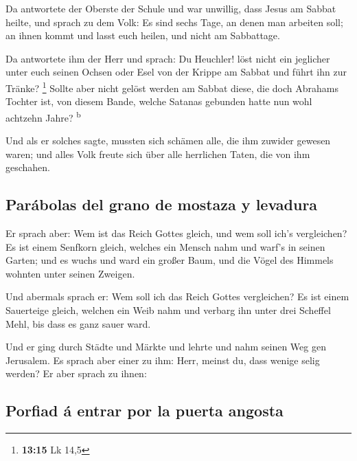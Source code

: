  Da antwortete der Oberste der Schule und war unwillig,
dass Jesus am Sabbat heilte, und sprach zu dem Volk: Es sind sechs Tage,
an denen man arbeiten soll; an ihnen kommt und lasst euch heilen, und
nicht am Sabbattage.

 Da antwortete ihm der Herr und sprach: Du Heuchler! löst
nicht ein jeglicher unter euch seinen Ochsen oder Esel von der Krippe am
Sabbat und führt ihn zur Tränke? \footnote{\textbf{13:15} Lk 14,5}
 Sollte aber nicht gelöst werden am Sabbat diese, die
doch Abrahams Tochter ist, von diesem Bande, welche Satanas gebunden
hatte nun wohl achtzehn Jahre? \textsuperscript{b}

 Und als er solches sagte, mussten sich schämen alle, die
ihm zuwider gewesen waren; und alles Volk freute sich über alle
herrlichen Taten, die von ihm geschahen.

\hypertarget{paruxe1bolas-del-grano-de-mostaza-y-levadura}{%
\subsection{Parábolas del grano de mostaza y
levadura}\label{paruxe1bolas-del-grano-de-mostaza-y-levadura}}

 Er sprach aber: Wem ist das Reich Gottes gleich, und wem
soll ich's vergleichen?  Es ist einem Senfkorn gleich,
welches ein Mensch nahm und warf's in seinen Garten; und es wuchs und
ward ein großer Baum, und die Vögel des Himmels wohnten unter seinen
Zweigen.

 Und abermals sprach er: Wem soll ich das Reich Gottes
vergleichen?  Es ist einem Sauerteige gleich, welchen ein
Weib nahm und verbarg ihn unter drei Scheffel Mehl, bis dass es ganz
sauer ward.

 Und er ging durch Städte und Märkte und lehrte und nahm
seinen Weg gen Jerusalem.  Es sprach aber einer zu ihm:
Herr, meinst du, dass wenige selig werden? Er aber sprach zu ihnen:

\hypertarget{porfiad-uxe1-entrar-por-la-puerta-angosta}{%
\subsection{Porfiad á entrar por la puerta
angosta}\label{porfiad-uxe1-entrar-por-la-puerta-angosta}}

